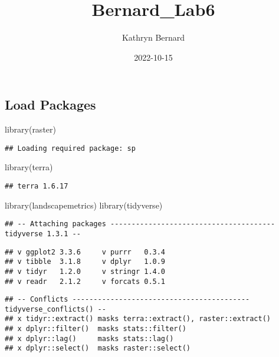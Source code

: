 \documentclass[
]{article}
\title{Bernard\_Lab6}
\author{Kathryn Bernard}
\date{2022-10-15}
\newenvironment{Shaded}{\begin{snugshade}}{\end{snugshade}}
\newcommand{\FunctionTok}[1]{\textcolor[rgb]{0.00,0.00,0.00}{#1}}
\newcommand{\NormalTok}[1]{#1}
\begin{document}
\maketitle

\hypertarget{load-packages}{%
\subsection{Load Packages}\label{load-packages}}

\begin{Shaded}
\begin{Highlighting}[]
\FunctionTok{library}\NormalTok{(raster)}
\end{Highlighting}
\end{Shaded}

\begin{verbatim}
## Loading required package: sp
\end{verbatim}

\begin{Shaded}
\begin{Highlighting}[]
\FunctionTok{library}\NormalTok{(terra)}
\end{Highlighting}
\end{Shaded}

\begin{verbatim}
## terra 1.6.17
\end{verbatim}

\begin{Shaded}
\begin{Highlighting}[]
\FunctionTok{library}\NormalTok{(landscapemetrics)}
\FunctionTok{library}\NormalTok{(tidyverse)}
\end{Highlighting}
\end{Shaded}

\begin{verbatim}
## -- Attaching packages --------------------------------------- tidyverse 1.3.1 --
\end{verbatim}

\begin{verbatim}
## v ggplot2 3.3.6     v purrr   0.3.4
## v tibble  3.1.8     v dplyr   1.0.9
## v tidyr   1.2.0     v stringr 1.4.0
## v readr   2.1.2     v forcats 0.5.1
\end{verbatim}

\begin{verbatim}
## -- Conflicts ------------------------------------------ tidyverse_conflicts() --
## x tidyr::extract() masks terra::extract(), raster::extract()
## x dplyr::filter()  masks stats::filter()
## x dplyr::lag()     masks stats::lag()
## x dplyr::select()  masks raster::select()
\end{verbatim}
\end{document}

